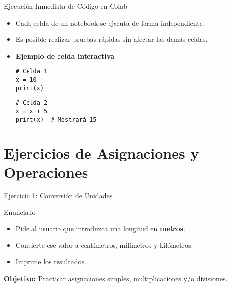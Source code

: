 \documentclass[10pt]{beamer}
\begin{document}
\begin{frame}[fragile]{Ejecución Inmediata de Código en Colab}
  \begin{itemize}
    \item Cada celda de un notebook se ejecuta de forma independiente.
    \item Es posible realizar pruebas rápidas sin afectar las demás celdas.
    \item \textbf{Ejemplo de celda interactiva}:
    \begin{verbatim}
# Celda 1
x = 10
print(x)
    \end{verbatim}

    \begin{verbatim}
# Celda 2
x = x + 5
print(x)  # Mostrará 15
    \end{verbatim}
  \end{itemize}
\end{frame}

\section{Ejercicios de Asignaciones y Operaciones}

\begin{frame}{Ejercicio 1: Conversión de Unidades}
  \begin{block}{Enunciado}
    \begin{itemize}
      \item Pide al usuario que introduzca una longitud en \textbf{metros}.
      \item Convierte ese valor a centímetros, milímetros y kilómetros.
      \item Imprime los resultados.
    \end{itemize}
  \end{block}
  \textbf{Objetivo:} Practicar asignaciones simples, multiplicaciones y/o divisiones.
\end{frame}
\end{document}
